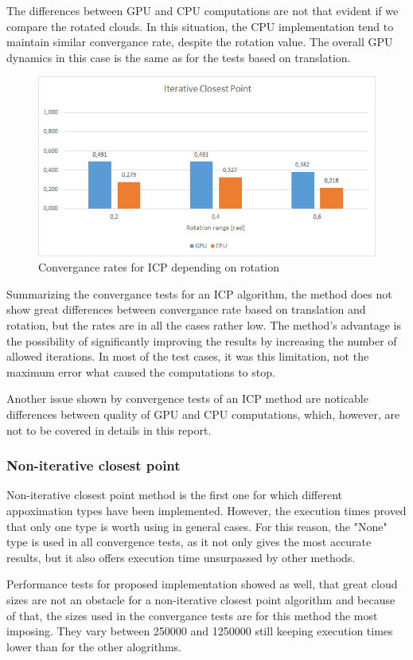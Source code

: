 \documentclass[titlepage]{article}
\begin{document}
The differences between GPU and CPU computations are not that evident if we compare the rotated clouds. In this situation, the CPU implementation tend to maintain similar convergance rate, despite the rotation value. The overall GPU dynamics in this case is the same as for the tests based on translation.
\begin{figure}[H]
\includegraphics[width=\textwidth]{ss-icp-3.png}
\caption{Convergance rates for ICP depending on rotation}
\end{figure}
Summarizing the convergance tests for an ICP algorithm, the method does not show great differences between convergance rate based on translation and rotation, but the rates are in all the cases rather low. The method's advantage is the possibility of significantly improving the results by increasing the number of allowed iterations. In most of the test cases, it was this limitation, not the maximum error what caused the computations to stop.

Another issue shown by convergence tests of an ICP method are noticable differences between quality of GPU and CPU computations, which, however, are not to be covered in details in this report.

\subsubsection{Non-iterative closest point}
Non-iterative closest point method is the first one for which different appoximation types have been implemented. However, the execution times proved that only one type is worth using in general cases. For this reason, the "None" type is used in all convergence tests, as it not only gives the most accurate results, but it also offers execution time unsurpassed by other methods.

Performance tests for proposed implementation showed as well, that great cloud sizes are not an obstacle for a non-iterative closest point algorithm and because of that, the sizes used in the convergance tests are for this method the most imposing. They vary between 250000 and 1250000 still keeping execution times lower than for the other alogrithms.
\end{document}
